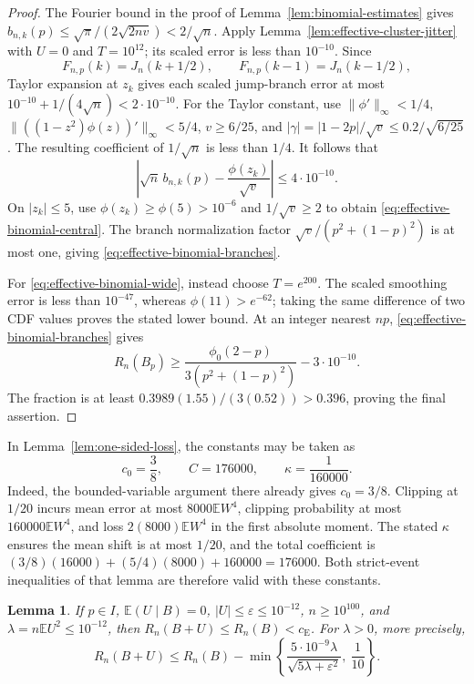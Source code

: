 \documentclass[aop]{imsart}
\theoremstyle{plain}
\newtheorem{lemma}[theorem]{Lemma}
\theoremstyle{definition}
\theoremstyle{definition}
\newcommand{\EE}{\mathbb E}
\newcommand{\ce}{c_{\mathrm E}}
\begin{document}
\begin{proof}
The Fourier bound in the proof of Lemma~\ref{lem:binomial-estimates}
gives
$b_{n,k}(p)\le\sqrt\pi/(2\sqrt{2nv})<2/\sqrt n$.
Apply Lemma~\ref{lem:effective-cluster-jitter} with $U=0$ and
$T=10^{12}$; its scaled error is less than $10^{-10}$.
Since
\[
 F_{n,p}(k)=J_n(k+1/2),\qquad
 F_{n,p}(k-1)=J_n(k-1/2),
\]
Taylor expansion at $z_k$ gives each scaled jump-branch error
at most $10^{-10}+1/(4\sqrt n)<2\cdot10^{-10}$.
For the Taylor constant, use
$\|\phi'\|_\infty<1/4$,
$\|((1-z^2)\phi(z))'\|_\infty<5/4$,
$v\ge6/25$, and $|\gamma|=|1-2p|/\sqrt v\le0.2/\sqrt{6/25}$.
The resulting coefficient of $1/\sqrt n$ is less than $1/4$.
It follows that
\[
 \left|\sqrt n\,b_{n,k}(p)-\frac{\phi(z_k)}{\sqrt v}\right|
 \le4\cdot10^{-10}.
\]
On $|z_k|\le5$, use $\phi(z_k)\ge\phi(5)>10^{-6}$ and
$1/\sqrt v\ge2$ to obtain \eqref{eq:effective-binomial-central}.
The branch normalization factor $\sqrt v/(p^2+(1-p)^2)$ is at most
one, giving \eqref{eq:effective-binomial-branches}.

For \eqref{eq:effective-binomial-wide}, instead choose $T=e^{200}$.
The scaled smoothing error is less than $10^{-47}$, whereas
$\phi(11)>e^{-62}$; taking the same difference of two CDF values
proves the stated lower bound.
At an integer nearest $np$, \eqref{eq:effective-binomial-branches}
gives
\[
 R_n(B_p)\ge
 \frac{\phi_0(2-p)}{3(p^2+(1-p)^2)}-3\cdot10^{-10}.
\]
The fraction is at least
$0.3989(1.55)/(3(0.52))>0.396$, proving the final assertion.
\end{proof}

In Lemma~\ref{lem:one-sided-loss}, the constants may be taken as
\begin{equation}\label{eq:effective-one-sided}
 c_0=\frac38,\qquad C=176000,\qquad \kappa=\frac1{160000}.
\end{equation}
Indeed, the bounded-variable argument there already gives $c_0=3/8$.
Clipping at $1/20$ incurs mean error at most $8000\EE W^4$,
clipping probability at most $160000\EE W^4$, and loss
$2(8000)\EE W^4$ in the first absolute moment.  The stated $\kappa$
ensures the mean shift is at most $1/20$, and the total coefficient is
$(3/8)(16000)+(5/4)(8000)+160000=176000$.
Both strict-event inequalities of that lemma are therefore valid
with these constants.

\begin{lemma}\label{lem:effective-small-variance}
If $p\in I$, $\EE(U\mid B)=0$, $|U|\le\varepsilon\le10^{-12}$,
$n\ge10^{100}$, and $\lambda=n\EE U^2\le10^{-12}$, then
$R_n(B+U)\le R_n(B)<\ce$.  For $\lambda>0$, more precisely,
\begin{equation}\label{eq:effective-small-gap}
 R_n(B+U)\le R_n(B)-
 \min\left\{\frac{5\cdot10^{-9}\lambda}
                  {\sqrt{5\lambda+\varepsilon^2}},\ \frac1{10}\right\}.
\end{equation}
\end{lemma}
\end{document}
